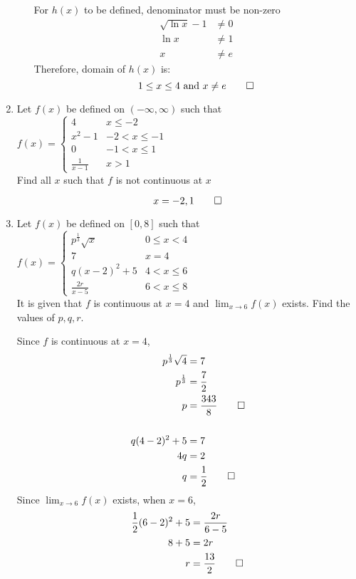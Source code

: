 \documentclass[12pt, a4paper]{article}
\begin{document}
\begin{enumerate}[Q\arabic*.]
\begin{enumerate}[(\alph*)]
      For $h(x)$ to be defined, denominator must be non-zero 
        \begin{align*}
          \sqrt{\ln x} - 1 &\neq 0 \\
          \ln x &\neq 1 \\
          x &\neq e
        \end{align*}
    Therefore, domain of \( h(x) \) is:
    \[
    1 \leq x \leq 4 \text{ and } x \neq e \qed
    \] 
  \end{enumerate}

\item Let $f(x)$ be defined on $(-\infty, \infty)$ such that $f(x) = \begin{cases} 
      4 & x \leq -2 \\
      x^2-1 & -2 < x\leq-1 \\
      0 & -1< x \leq 1 \\
      \displaystyle\frac{1}{x-1} & x > 1
   \end{cases}
$ \\ Find all $x$ such that $f$ is not continuous at $x$

\[
x = -2, 1 \qed
\]

\item Let $f(x)$ be defined on $[0, 8]$ such that $f(x) = \begin{cases} 
    p^\frac{1}{3}\sqrt{x} & 0 \leq x < 4 \\
      7 & x=4 \\
      q(x-2)^2 + 5 & 4 < x \leq 6 \\
      \displaystyle\frac{2r}{x-5} & 6 < x \leq 8
   \end{cases}$ \\
   It is given that $f$ is continuous at $x = 4$ and $\lim_{x\to6} f(x)$  exists. Find the values of $p, q, r$.
   
Since $f$ is continuous at $x = 4$,
\begin{align*}
  p^\frac{1}{3}\sqrt{4} &= 7 \\
  p^\frac{1}{3} &= \frac{7}{2} \\
  p &= \frac{343}{8} \qed \\
    &\\
  q(4 - 2)^2 + 5 &= 7 \\
  4q &= 2 \\ 
  q &= \frac{1}{2} \qed
\end{align*}
Since $\lim_{x\to6} f(x)$ exists, when $x = 6$,
\begin{align*}
  \frac{1}{2}(6-2)^2 + 5 &= \frac{2r}{6-5} \\
  8 + 5 &= 2r \\
  r &= \frac{13}{2} \qed
\end{align*}


\end{enumerate}
\end{document}
